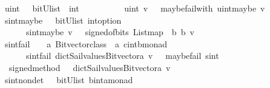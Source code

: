 \begin{isabellebody}
\isanewline
{}\isamarkupfalse%
\ uint\ \ {\isacharcolon}{\isacharcolon}\ {\isachardoublequoteopen}{\isacharparenleft}bitU{\isacharparenright}list\ {\isasymRightarrow}\ int\ {\isachardoublequoteclose}\ \ \ \isanewline
\ \ \ \ \ {\isachardoublequoteopen}\ uint\ v\ {\isacharequal}\ {\isacharparenleft}\ maybe{\isacharunderscore}failwith\ {\isacharparenleft}uint{\isacharunderscore}maybe\ v{\isacharparenright}{\isacharparenright}{\isachardoublequoteclose}\isanewline
\isanewline
\isanewline
%
\isanewline
{}\isamarkupfalse%
\ sint{\isacharunderscore}maybe\ \ {\isacharcolon}{\isacharcolon}\ {\isachardoublequoteopen}{\isacharparenleft}bitU{\isacharparenright}list\ {\isasymRightarrow}{\isacharparenleft}int{\isacharparenright}option\ {\isachardoublequoteclose}\ \ \ \isanewline
\ \ \ \ \ {\isachardoublequoteopen}\ sint{\isacharunderscore}maybe\ v\ {\isacharequal}\ {\isacharparenleft}\ signed{\isacharunderscore}of{\isacharunderscore}bits\ {\isacharparenleft}List{\isachardot}map\ {\isacharparenleft}{\isasymlambda}\ b{\isachardot}\ b{\isacharparenright}\ v{\isacharparenright}{\isacharparenright}{\isachardoublequoteclose}\isanewline
\isanewline
{}\isamarkupfalse%
\ sint{\isacharunderscore}fail\ \ {\isacharcolon}{\isacharcolon}\ {\isachardoublequoteopen}\ {\isacharprime}a\ Bitvector{\isacharunderscore}class\ {\isasymRightarrow}\ {\isacharprime}a\ {\isasymRightarrow}{\isacharparenleft}{\isacharprime}c{\isacharcomma}{\isacharparenleft}int{\isacharparenright}{\isacharcomma}{\isacharprime}b{\isacharparenright}monad\ {\isachardoublequoteclose}\ \ \ \isanewline
\ \ \ \ \ {\isachardoublequoteopen}\ sint{\isacharunderscore}fail\ dict{\isacharunderscore}Sail{}{\isacharunderscore}values{\isacharunderscore}Bitvector{\isacharunderscore}a\ v\ {\isacharequal}\ {\isacharparenleft}\ maybe{\isacharunderscore}fail\ {\isacharparenleft}{\isacharprime}{\isacharprime}sint{\isacharprime}{\isacharprime}{\isacharparenright}\ {\isacharparenleft}\isanewline
\ \ {\isacharparenleft}signed{\isacharunderscore}method\ \ \ dict{\isacharunderscore}Sail{}{\isacharunderscore}values{\isacharunderscore}Bitvector{\isacharunderscore}a{\isacharparenright}\ v{\isacharparenright}{\isacharparenright}{\isachardoublequoteclose}\isanewline
\isanewline
{}\isamarkupfalse%
\ sint{\isacharunderscore}nondet\ \ {\isacharcolon}{\isacharcolon}\ {\isachardoublequoteopen}{\isacharparenleft}bitU{\isacharparenright}list\ {\isasymRightarrow}{\isacharparenleft}{\isacharprime}b{\isacharcomma}{\isacharparenleft}int{\isacharparenright}{\isacharcomma}{\isacharprime}a{\isacharparenright}monad\ {\isachardoublequoteclose}\ \ \ \isanewline

\end{isabellebody}
